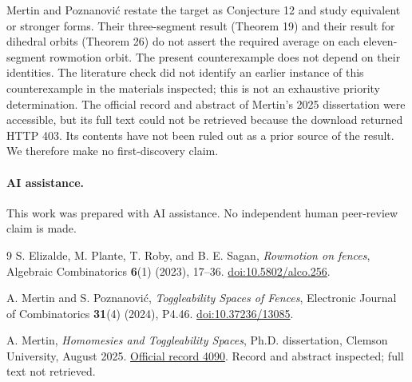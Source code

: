 \documentclass[11pt]{article}
\begin{document}
Mertin and Poznanovi\'c \cite{mp} restate the target as Conjecture 12
and study equivalent or stronger forms. Their three-segment result
(Theorem 19) and their result for dihedral orbits (Theorem 26) do not
assert the required average on each eleven-segment rowmotion orbit.
The present counterexample does not depend on their identities.
The literature check did not identify an earlier instance of this
counterexample in the materials inspected; this is not an exhaustive
priority determination. The official record and abstract of Mertin's
2025 dissertation \cite{mertin} were accessible, but its full text could
not be retrieved because the download returned HTTP 403. Its contents
have not been ruled out as a prior source of the result. We therefore
make no first-discovery claim.

\paragraph{AI assistance.}
This work was prepared with AI assistance. No independent human
peer-review claim is made.

\begin{thebibliography}{9}
S. Elizalde, M. Plante, T. Roby, and B. E. Sagan,
\emph{Rowmotion on fences}, Algebraic Combinatorics \textbf{6}(1)
(2023), 17--36. \href{https://doi.org/10.5802/alco.256}{doi:10.5802/alco.256}.

A. Mertin and S. Poznanovi\'c,
\emph{Toggleability Spaces of Fences}, Electronic Journal of
Combinatorics \textbf{31}(4) (2024), P4.46.
\href{https://doi.org/10.37236/13085}{doi:10.37236/13085}.

A. Mertin, \emph{Homomesies and Toggleability Spaces}, Ph.D. dissertation,
Clemson University, August 2025.
\href{https://open.clemson.edu/all_dissertations/4090/}{Official record 4090}.
Record and abstract inspected; full text not retrieved.
\end{thebibliography}

\appendix
\end{document}
